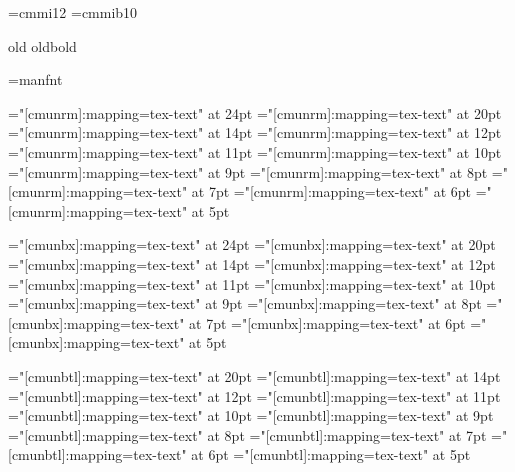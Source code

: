 

%

\setfonts[/11pt]
\setfonts[CMRoman/]
\def\smallish{\setfonts[/mag.9]}
\def\smaller{\setfonts[/mag.8]}
\def\smallest{\setfonts[/mag.7]}
\def\larger{\setfonts[/mag1.2]}
\def\largest{\setfonts[/mag1.3]}
\font\twelvei=cmmi12
\font\tenmib=cmmib10
\def\xiioldrm{ \twelvei\relax}
\def\xoldbf{\tenmib\relax}

\DefStyle old {\xiioldrm}
\DefStyle oldbold {\xoldbf}


\font\manual=manfnt

\def\scshape{%
\font\sc="[cmunrm]:+smcp:mapping=tex-text" at \fontdimen6\font
\sc%
}

\font\twentyfourrm="[cmunrm]:mapping=tex-text"  at 24pt
\font\twentyrm="[cmunrm]:mapping=tex-text"      at 20pt
\font\fourteenrm="[cmunrm]:mapping=tex-text"    at 14pt
\font\twelverm="[cmunrm]:mapping=tex-text"      at 12pt
\font\elevenrm="[cmunrm]:mapping=tex-text"      at 11pt
\font\tenrm="[cmunrm]:mapping=tex-text"         at 10pt
\font\ninerm="[cmunrm]:mapping=tex-text"        at 9pt
\font\eightrm="[cmunrm]:mapping=tex-text"       at 8pt
\font\sevenrm="[cmunrm]:mapping=tex-text"       at 7pt
\font\sixrm="[cmunrm]:mapping=tex-text"         at 6pt
\font\fiverm="[cmunrm]:mapping=tex-text"        at 5pt

\font\twentyfourbf="[cmunbx]:mapping=tex-text"  at 24pt
\font\twentybf="[cmunbx]:mapping=tex-text"      at 20pt
\font\fourteenbf="[cmunbx]:mapping=tex-text"    at 14pt
\font\twelvebf="[cmunbx]:mapping=tex-text"      at 12pt
\font\elevenbf="[cmunbx]:mapping=tex-text"      at 11pt
\font\tenbf="[cmunbx]:mapping=tex-text"         at 10pt
\font\ninebf="[cmunbx]:mapping=tex-text"        at 9pt
\font\eightbf="[cmunbx]:mapping=tex-text"       at 8pt
\font\sevenbf="[cmunbx]:mapping=tex-text"       at 7pt
\font\sixbf="[cmunbx]:mapping=tex-text"         at 6pt
\font\fivebf="[cmunbx]:mapping=tex-text"        at 5pt

\font\twentytt="[cmunbtl]:mapping=tex-text"     at 20pt
\font\fourteentt="[cmunbtl]:mapping=tex-text"   at 14pt
\font\twelvett="[cmunbtl]:mapping=tex-text"     at 12pt
\font\eleventt="[cmunbtl]:mapping=tex-text"     at 11pt
\font\tentt="[cmunbtl]:mapping=tex-text"        at 10pt
\font\ninett="[cmunbtl]:mapping=tex-text"       at 9pt
\font\eighttt="[cmunbtl]:mapping=tex-text"      at 8pt
\font\seventt="[cmunbtl]:mapping=tex-text"      at 7pt
\font\sixtt="[cmunbtl]:mapping=tex-text"        at 6pt
\font\fivett="[cmunbtl]:mapping=tex-text"       at 5pt

